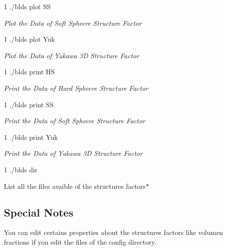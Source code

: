 \begin{DoxyCode}
1 ./blds plot SS
\end{DoxyCode}
 {\itshape Plot the Data of Soft Spheere Structure Factor}


\begin{DoxyCode}
1 ./blds plot Yuk
\end{DoxyCode}
 {\itshape Plot the Data of Yukawa 3D Structure Factor}


\begin{DoxyCode}
1 ./blds print HS
\end{DoxyCode}
 {\itshape Print the Data of Hard Spheere Structure Factor}


\begin{DoxyCode}
1 ./blds print SS
\end{DoxyCode}
 {\itshape Print the Data of Soft Spheere Structure Factor}


\begin{DoxyCode}
1 ./blds print Yuk
\end{DoxyCode}
 {\itshape Print the Data of Yukawa 3D Structure Factor}


\begin{DoxyCode}
1 ./blds dir
\end{DoxyCode}

\begin{DoxyItemize}
\item List all the files avaible of the structures factors$\ast$
\end{DoxyItemize}

\subsection*{Special Notes}

You can edit certains properties about the structures factors like volumen fractions if you edit the files of the config directory. 